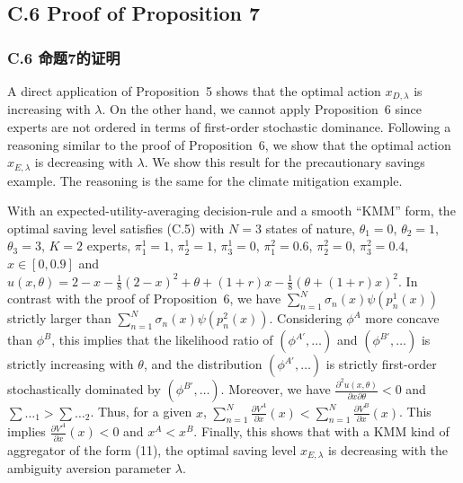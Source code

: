\documentclass[12pt,a4paper]{article}
\newenvironment{original}
  {\par\noindent\ignorespaces}
  {\par}
\begin{document}
\subsection*{C.6 Proof of Proposition 7}
{\color{transblue}\subsubsection*{C.6 命题7的证明}}

\begin{original}
A direct application of Proposition~5 shows that the optimal action $x_{D,\lambda}$ is increasing with $\lambda$. On the other hand, we cannot apply Proposition~6 since experts are not ordered in terms of first-order stochastic dominance. Following a reasoning similar to the proof of Proposition~6, we show that the optimal action $x_{E,\lambda}$ is decreasing with $\lambda$. We show this result for the precautionary savings example. The reasoning is the same for the climate mitigation example.

With an expected-utility-averaging decision-rule and a smooth ``KMM'' form, the optimal saving level satisfies (C.5) with $N = 3$ states of nature, $\theta_{1} = 0$, $\theta_{2} = 1$, $\theta_{3} = 3$, $K = 2$ experts, $\pi^{1}_{1} = 1$, $\pi^{1}_{2} = 1$, $\pi^{1}_{3} = 0$, $\pi^{2}_{1} = 0.6$, $\pi^{2}_{2} = 0$, $\pi^{2}_{3} = 0.4$, $x \in [0, 0.9]$ and $u(x, \theta) = 2 - x - \frac{1}{8}(2 - x)^{2} + \theta + (1 + r)x - \frac{1}{8}(\theta + (1 + r)x)^{2}$. In contrast with the proof of Proposition~6, we have $\sum_{n=1}^{N} \sigma_{n}(x) \psi(p^{1}_{n}(x))$ strictly larger than $\sum_{n=1}^{N} \sigma_{n}(x) \psi(p^{2}_{n}(x))$. Considering $\phi^{A}$ more concave than $\phi^{B}$, this implies that the likelihood ratio of $(\phi^{A\prime}, \dots)$ and $(\phi^{B\prime}, \dots)$ is strictly increasing with $\theta$, and the distribution $(\phi^{A\prime}, \dots)$ is strictly first-order stochastically dominated by $(\phi^{B\prime}, \dots)$. Moreover, we have $\frac{\partial^{2} u(x,\theta)}{\partial x \partial \theta} < 0$ and $\sum \dots_{1} > \sum \dots_{2}$. Thus, for a given $x$, $\sum_{n=1}^{N} \frac{\partial V^{A}}{\partial x}(x) < \sum_{n=1}^{N} \frac{\partial V^{B}}{\partial x}(x)$. This implies $\frac{\partial V^{A}}{\partial x}(x) < 0$ and $x^{A} < x^{B}$. Finally, this shows that with a KMM kind of aggregator of the form (11), the optimal saving level $x_{E,\lambda}$ is decreasing with the ambiguity aversion parameter $\lambda$.
\end{original}
\end{document}
